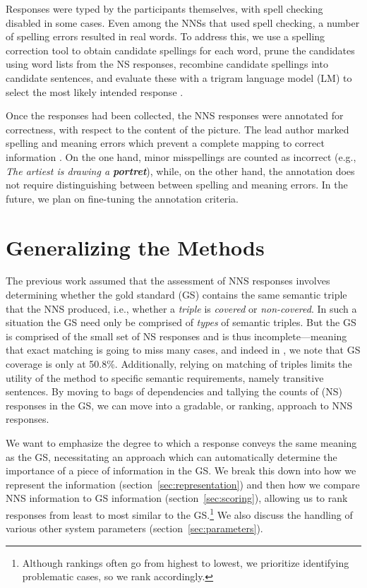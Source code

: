 Responses were typed by the participants themselves, with spell checking disabled in some cases.  Even among the NNSs that used spell checking, a number of spelling errors resulted in real words. To address this, we use a spelling correction tool to obtain candidate spellings for each word, prune the candidates using word lists from the NS responses, recombine candidate spellings into candidate sentences, and evaluate these with a trigram language model (LM) to select the most likely intended response \citep{king:dickinson:14}.

Once the responses had been collected, the NNS responses were
annotated for correctness, with respect to the content of the picture.
The lead author marked spelling and meaning errors which prevent a
complete mapping to correct information
\citep[see][]{king:dickinson:13}.  On the one hand, minor misspellings
are counted as incorrect (e.g., \textit{The artiest is drawing a
\textbf{portret}}), while, on the other hand, the annotation does
not require distinguishing between between spelling and meaning
errors.  In the future, we plan on fine-tuning the annotation
criteria.

\section{Generalizing the Methods}
\label{sec:ranking}

The previous work assumed that the assessment of NNS responses
involves determining whether the gold standard (GS) contains the same
semantic triple that the NNS produced, i.e., whether a \textit{triple}
is \textit{covered} or \textit{non-covered}.  In such a situation the
GS need only be comprised of \textit{types} of semantic triples.  But
the GS is comprised of the small set of NS responses and is thus
incomplete---meaning that exact matching is going to miss many cases,
and indeed in \citet{king:dickinson:13}, we note
that GS coverage is only at 50.8\%.  Additionally, relying on matching
of triples limits the utility of the method to specific semantic
requirements, namely transitive sentences.  By moving to bags of
dependencies and tallying the counts of (NS) responses in the GS, we
can move into a gradable, or ranking, approach to NNS responses.

We want to emphasize the degree to which a response conveys the same
meaning as the GS, necessitating an approach which can automatically
determine the importance of a piece of information in the GS.  We
break this down into how we represent the information
(section~\ref{sec:representation}) and then how we compare NNS
information to GS information (section~\ref{sec:scoring}), allowing us
to rank responses from least to most similar to the GS.\footnote{Although rankings often go from highest to lowest, we prioritize identifying problematic cases, so we rank accordingly.}  We also
discuss the handling of various other system parameters (section~\ref{sec:parameters}).

